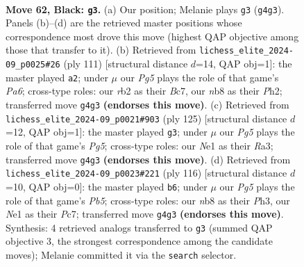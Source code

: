\documentclass[11pt]{article}
\begin{document}
\clearpage

\begin{figure}[p]\centering
\begin{subfigure}{0.46\textwidth}\centering
\resizebox{\linewidth}{!}{%
\newchessgame
\chessboard[
  setfen={1N6/8/3p2k1/8/6pp/8/1R6/4n2K b - - 0 62},
  showmover=false,
  pgfstyle=straightmove, color=movearrow, markmove={g4-g3}
]}
\caption{}
\end{subfigure}\hfill
\begin{subfigure}{0.46\textwidth}\centering
\resizebox{\linewidth}{!}{%
\newchessgame
\chessboard[
  setfen={8/2b5/4p3/1k6/8/p2K4/7p/7N b - - 1 56},
  showmover=false,
  pgfstyle=straightmove, color=movearrow, markmove={a3-a2}
]}
\caption{}
\end{subfigure}
\\[4pt]
\begin{subfigure}{0.46\textwidth}\centering
\resizebox{\linewidth}{!}{%
\newchessgame
\chessboard[
  setfen={8/8/5k2/1R6/5pp1/r7/3K4/3N4 b - - 0 63},
  showmover=false,
  pgfstyle=straightmove, color=movearrow, markmove={g4-g3}
]}
\caption{}
\end{subfigure}\hfill
\begin{subfigure}{0.46\textwidth}\centering
\resizebox{\linewidth}{!}{%
\newchessgame
\chessboard[
  setfen={4r3/2P5/8/1P6/5p2/7P/2K1k3/8 w - - 1 59},
  showmover=false,
  pgfstyle=straightmove, color=movearrow, markmove={b5-b6}
]}
\caption{}
\end{subfigure}
\caption{\textbf{Move 62, Black: \texttt{g3}.} (a) Our position; Melanie plays \texttt{g3} (\texttt{g4g3}). Panels (b)--(d) are the retrieved master positions whose correspondence most drove this move (highest QAP objective among those that transfer to it). (b) Retrieved from \texttt{lichess\_elite\_2024-09\_p0025\#26} (ply 111) [structural distance $d$=14, QAP obj=1]: the master played \texttt{a2}; under $\mu$ our \emph{Pg5} plays the role of that game's \emph{Pa6}; cross-type roles: our \emph{r}b2 as their \emph{B}c7, our \emph{n}b8 as their \emph{P}h2; transferred move \texttt{g4g3} \textbf{(endorses this move)}. (c) Retrieved from \texttt{lichess\_elite\_2024-09\_p0021\#903} (ply 125) [structural distance $d$=12, QAP obj=1]: the master played \texttt{g3}; under $\mu$ our \emph{Pg5} plays the role of that game's \emph{Pg5}; cross-type roles: our \emph{N}e1 as their \emph{R}a3; transferred move \texttt{g4g3} \textbf{(endorses this move)}. (d) Retrieved from \texttt{lichess\_elite\_2024-09\_p0023\#221} (ply 116) [structural distance $d$=10, QAP obj=0]: the master played \texttt{b6}; under $\mu$ our \emph{Pg5} plays the role of that game's \emph{Pb5}; cross-type roles: our \emph{n}b8 as their \emph{P}h3, our \emph{N}e1 as their \emph{P}c7; transferred move \texttt{g4g3} \textbf{(endorses this move)}. Synthesis: 4 retrieved analogs transferred to \texttt{g3} (summed QAP objective 3, the strongest correspondence among the candidate moves); Melanie committed it via the \texttt{search} selector.}
\label{fig:thought-m123}
\end{figure}
\end{document}

